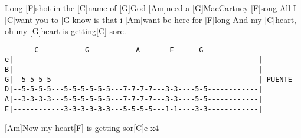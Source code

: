 \begin{guitar}
  [Am]Long [F]shot in the [C]name of [G]God
  [Am]need a [G]MacCartney [F]song
  All I [C]want you to [G]know
  is that i [Am]want be here for [F]long
  And my [C]heart, oh my [G]heart is getting[C] sore.
\begin{texttt}
\begin{verbatim}
       C           G           A       F      G
e|----------------------------------------------------------|
B|----------------------------------------------------------|
G|--5-5-5-5-------------------------------------------------| PUENTE
D|--5-5-5-5---5-5-5-5-5-5---7-7-7-7---3-3----5-5------------|
A|--3-3-3-3---5-5-5-5-5-5---7-7-7-7---3-3----5-5------------|
E|------------3-3-3-3-3-3---5-5-5-5---1-1----3-3------------|
\end{verbatim}
\end{texttt}
[Am]Now my heart[F] is getting sor[C]e \hspace{1cm}x4
\end{guitar}
